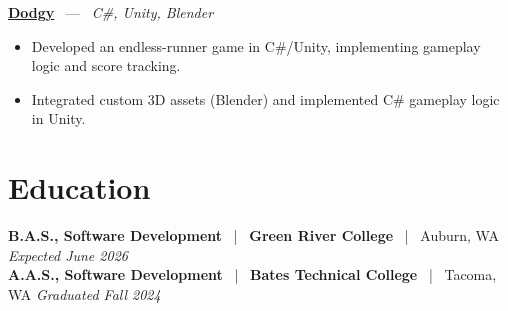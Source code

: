 \documentclass[10pt, letterpaper]{article}
\newcommand{\jobhead}[4]{%
  \vspace{5pt}%
  {\bfseries\color{dark}#1}%
  ~{\color{light}|}~%
  {\bfseries\color{navy}#2}%
  ~{\color{light}|}~%
  {\color{light}#3}%
  \hfill{\color{light}\small\textit{#4}}\\[-2pt]%
}
\newcommand{\projhead}[3]{%
  \vspace{5pt}%
  {\bfseries\color{dark}\href{#2}{#1}}%
  ~{\color{light}---}~%
  {\color{light}\small\textit{#3}}\\[-2pt]%
}
\begin{document}
\projhead{Dodgy}{https://timyd.itch.io/dodgy}{C\#, Unity, Blender}
\begin{itemize}
  \item Developed an endless-runner game in C\#/Unity, implementing gameplay logic and score tracking.
  \item Integrated custom 3D assets (Blender) and implemented C\# gameplay logic in Unity.
\end{itemize}

\section{Education}

\jobhead{B.A.S., Software Development}{Green River College}{Auburn, WA}{Expected June 2026}
\jobhead{A.A.S., Software Development}{Bates Technical College}{Tacoma, WA}{Graduated Fall 2024}
\end{document}
